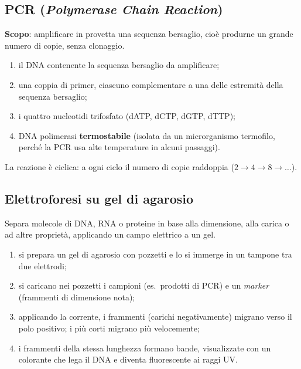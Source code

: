 \subsection{\texorpdfstring{PCR (\textit{Polymerase Chain Reaction})}{PCR (Polymerase Chain Reaction)}}

\textbf{Scopo}: amplificare in provetta una sequenza bersaglio, cioè produrne un grande numero di copie, senza clonaggio.

\begin{enumerate}
  \item il DNA contenente la sequenza bersaglio da amplificare;
  \item una coppia di primer, ciascuno complementare a una delle estremità della sequenza bersaglio;
  \item i quattro nucleotidi trifosfato (dATP, dCTP, dGTP, dTTP);
  \item DNA polimerasi \textbf{termostabile} (isolata da un microrganismo termofilo, perché la PCR usa alte temperature in alcuni passaggi).
\end{enumerate}
La reazione è ciclica: a ogni ciclo il numero di copie raddoppia ($2 \rightarrow 4 \rightarrow 8 \rightarrow \dots$).

\subsection{Elettroforesi su gel di agarosio}

Separa molecole di DNA, RNA o proteine in base alla dimensione, alla carica o ad altre proprietà, applicando un campo elettrico a un gel.
\begin{enumerate}
  \item si prepara un gel di agarosio con pozzetti e lo si immerge in un tampone tra due elettrodi;
  \item si caricano nei pozzetti i campioni (es.\ prodotti di PCR) e un \textit{marker} (frammenti di dimensione nota);
  \item applicando la corrente, i frammenti (carichi negativamente) migrano verso il polo positivo; i più corti migrano più velocemente;
  \item i frammenti della stessa lunghezza formano bande, visualizzate con un colorante che lega il DNA e diventa fluorescente ai raggi UV.
\end{enumerate}

